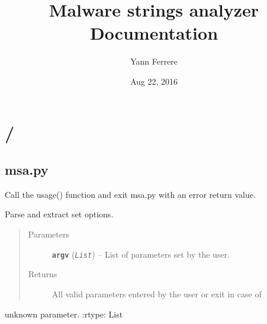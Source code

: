 \documentclass[letterpaper,10pt,oneside]{sphinxmanual}
\title{Malware strings analyzer Documentation}
\date{Aug 22, 2016}
\author{Yann Ferrere}
\begin{document}
\maketitle
\tableofcontents
{}\label{index::doc}



\chapter{/}
\label{index:welcome-to-malware-strings-analyzer-s-documentation}\label{index:id1}

\section{msa.py}
\label{index:module-msa}\label{index:msa-py}

\begin{fulllineitems}
\label{index:msa.exit_error}
Call the usage() function and exit msa.py with an error return
value.

\end{fulllineitems}


\begin{fulllineitems}
\label{index:msa.getopts}
Parse and extract set options.
\begin{quote}\begin{description}
\item[{Parameters}] \leavevmode
\textbf{\texttt{argv}} (\emph{\texttt{List}}) -- List of parameters set by the user.

\item[{Returns}] \leavevmode
All valid parameters entered by the user or exit in case of

\end{description}\end{quote}

unknown parameter.
:rtype: List

\end{fulllineitems}

\end{document}
